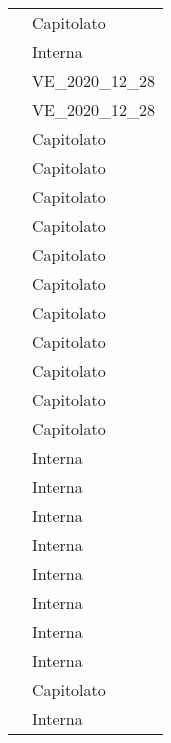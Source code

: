 \begin{longtable}{C{6cm} C{6cm}}
     & Capitolato  \\

	 & Interna \\

	 & VE\_2020\_12\_28 \\

	 & VE\_2020\_12\_28 \\
	
     & Capitolato \\
	
     & Capitolato \\
    
     & Capitolato \\
    
     & Capitolato \\
    
     & Capitolato \\
    
     & Capitolato \\
    
     & Capitolato \\
    
     & Capitolato \\
    
     & Capitolato \\
    
     & Capitolato \\
    
     & Capitolato \\
    
     & Interna \\
    
     & Interna \\
    
     & Interna \\
    
     & Interna \\
    
     & Interna \\
    
     & Interna \\
    
     & Interna \\
    
     & Interna \\
    
     & Capitolato \\

	 & Interna \\
    
\end{longtable}